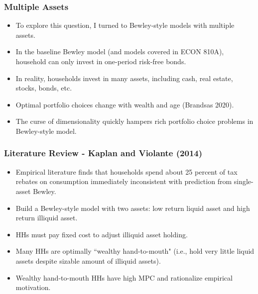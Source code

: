 \documentclass[handout]{beamer}
\begin{document}
\begin{frame}
\frametitle{Multiple Assets}
\begin{itemize}[<+->]
\item To explore this question, I turned to Bewley-style models with multiple assets.
\bigskip
\item In the baseline Bewley model (and models covered in ECON 810A), household can only invest in one-period risk-free bonds.
\bigskip
\item In reality, households invest in many assets, including cash, real estate, stocks, bonds, etc.
\bigskip
\item Optimal portfolio choices change with wealth and age (Brandsas 2020).
\bigskip
\item The curse of dimensionality quickly hampers rich portfolio choice problems in Bewley-style model.
\end{itemize}
\end{frame}





\begin{frame}
\frametitle{Literature Review - Kaplan and Violante (2014)}


\begin{itemize}[<+->]
\item Empirical literature finds that households spend about 25 percent of tax rebates on consumption immediately inconsistent with prediction from single-asset Bewley.
\bigskip
\item Build a Bewley-style model with two assets: low return liquid asset and high return illiquid asset.
\bigskip
\item HHs must pay fixed cost to adjust illiquid asset holding.
\bigskip
\item Many HHs are optimally ``wealthy hand-to-mouth" (i.e., hold very little liquid assets despite sizable amount of illiquid assets).
\bigskip
\item Wealthy hand-to-mouth HHs have high MPC and rationalize empirical motivation.
\end{itemize}

\end{frame}
\end{document}
